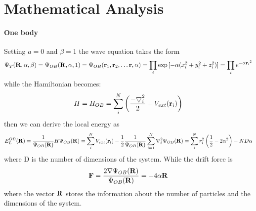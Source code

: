 \documentclass[10pt,a4paper,titlepage]{article}
\begin{document}
\section*{Mathematical Analysis}
\paragraph{One body} Setting $a=0$ and $\beta=1$ the wave equation takes the form
 \begin{equation}
 \Psi_{T}({\bf R},\alpha, \beta) = \Psi_{OB}({\bf R},\alpha, 1)=\Psi_{OB}({\bf r}_1, {\bf r}_2, \dots {\bf r},\alpha)=\prod_i \exp{[-\alpha(x_i^2+y_i^2+ z_i^2)]}=\prod_i e^{-\alpha { \bf r_i}^2}
 \label{eq:wfOB}
 \end{equation} 
 while the Hamiltonian becomes:
  \begin{equation}
     H = H_{OB} = \sum_i^N \left(\frac{
	 { - \bigtriangledown }_{i}^2}{2} +
	 V_{ext}({\bf{r}}_i)\right)
 \end{equation}
 then we can derive the local energy as
\begin{equation}
E_L^{OB}({\bf R})=\frac{1}{\Psi_{OB}({\bf R})}H\Psi_{OB}({\bf R})=\sum_i^{N} V_{ext}({\bf r_i}) - \frac{1}{2} \frac{1}{\Psi_{OB}({\bf R})}\sum_{i=1}^{N}\nabla_i^2\Psi_{OB}({\bf R})= \sum_i^N r_i^2\left(\frac{1}{2} - 2 \alpha^2\right) - ND\alpha
\label{eq:localeOB}
\end{equation}
where D is the number of dimensions of the system.
While the drift force is
\begin{equation}
{\bf F}= \frac{ 2\nabla \Psi_{OB}({\bf R})}{\Psi_{OB}({\bf R})} = - 4 \alpha {\bf R} 
\label{eq:gradiente}
\end{equation} 
where the vector $\bf R$ stores the information about the number of particles and the dimensions of the system.
 
 
\end{document}

